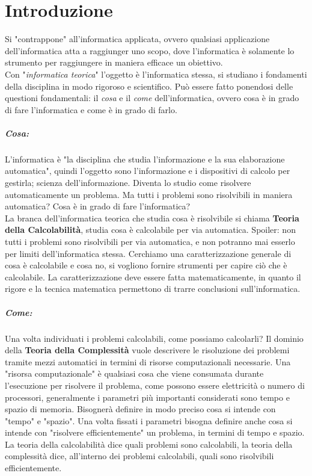 
\chapter*{Introduzione}

Si "contrappone" all'informatica applicata, ovvero qualsiasi applicazione dell'informatica atta a raggiunger uno scopo, dove l'informatica è solamente lo strumento per raggiungere in maniera efficace un obiettivo.\\
Con "\textit{informatica teorica}" l'oggetto è l'informatica stessa, si studiano i fondamenti della disciplina in modo rigoroso e scientifico. Può essere fatto ponendosi delle questioni fondamentali: il \textit{cosa} e il \textit{come} dell'informatica, ovvero cosa è in grado di fare l'informatica e come è in grado di farlo.

\paragraph{Cosa:} L'informatica è "la disciplina che studia l'informazione e la sua elaborazione automatica", quindi l'oggetto sono l'informazione e i dispositivi di calcolo per gestirla; scienza dell'informazione. Diventa lo studio come risolvere automaticamente un problema. Ma tutti i problemi sono risolvibili in maniera automatica? Cosa è in grado di fare l'informatica? \\

La branca dell'informatica teorica che studia cosa è risolvibile si chiama \textbf{Teoria della Calcolabilità}, studia cosa è calcolabile per via automatica. Spoiler: non tutti i problemi sono risolvibili per via automatica, e non potranno mai esserlo per limiti dell'informatica stessa. Cerchiamo una caratterizzazione generale di cosa è calcolabile e cosa no, si vogliono fornire strumenti per capire ciò che è calcolabile. La caratterizzazione deve essere fatta matematicamente, in quanto il rigore e la tecnica matematica permettono di trarre conclusioni sull'informatica.

\paragraph{Come:} Una volta individuati i problemi calcolabili, come possiamo calcolarli? Il dominio della \textbf{Teoria della Complessità} vuole descrivere le risoluzione dei problemi tramite mezzi automatici in termini di risorse computazionali necessarie. Una "risorsa computazionale" è qualsiasi cosa che viene consumata durante l'esecuzione per risolvere il problema, come possono essere elettricità o numero di processori, generalmente i parametri più importanti considerati sono tempo e spazio di memoria. Bisognerà definire in modo preciso cosa si intende con "tempo" e "spazio". Una volta fissati i parametri bisogna definire anche cosa si intende con "risolvere efficientemente" un problema, in termini di tempo e spazio.\\

La teoria della calcolabilità dice quali problemi sono calcolabili, la teoria della complessità dice, all'interno dei problemi calcolabili, quali sono risolvibili efficientemente.\\